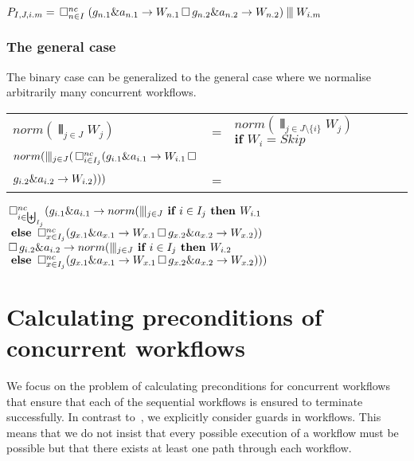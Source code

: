 \documentclass[11pt]{article}
\begin{document}
\noindent
$P_{I,J,i.m} = \, \Box^{nc}_{n \in I} \; (g_{n.1} \& a_{n.1} \rightarrow W_{n.1} \, \Box \, g_{n.2} \& a_{n.2} \rightarrow W_{n.2}) \interleave W_{i.m}$


\subsubsection{The general case}

The binary case can be generalized to the general case where we normalise arbitrarily many concurrent workflows.

\begin{tabular}{l c l}
    $norm(\interleave_{j \in J} W_j)$ &=& $norm(\interleave_{j \in J\setminus\{i\}} W_j)$ \quad $\textbf{if } W_i = Skip$ \\
    $norm(\interleave_{j \in J} (\, \Box^{nc}_{i \in I_j} (g_{i.1} \& a_{i.1} \rightarrow W_{i.1} 
                                                \, \Box \,$ \\
\hspace*{90pt}                        $g_{i.2} \& a_{i.2} \rightarrow W_{i.2})))$ &=& \\
\end{tabular}

\noindent
$\, \Box^{nc}_{i \in \biguplus_{I_j}} (g_{i.1} \& a_{i.1} \rightarrow norm(\interleave_{j \in J} \textbf{ if } i \in I_j \textbf{ then } W_{i.1}$ \\ 
 \hspace*{190pt} $ \textbf{ else } \, \Box^{nc}_{x \in I_j} (g_{x.1} \& a_{x.1} \rightarrow W_{x.1} \, \Box \, g_{x.2} \& a_{x.2} \rightarrow W_{x.2}))$ \\ 
\hspace*{28pt}$\, \Box \, g_{i.2} \& a_{i.2} \rightarrow norm(\interleave_{j \in J} \textbf{ if } i \in I_j \textbf{ then } W_{i.2}$ \\ 
 \hspace*{190pt} $ \textbf{ else } \, \Box^{nc}_{x \in I_j} (g_{x.1} \& a_{x.1} \rightarrow W_{x.1} \, \Box \, g_{x.2} \& a_{x.2} \rightarrow W_{x.2})))$     


\section{Calculating preconditions of concurrent workflows}
\label{sec:shared_workflows}

We focus on the problem of calculating preconditions for concurrent workflows that ensure that each of the sequential workflows is ensured to terminate successfully. In contrast to~\cite{Wang2012}, we explicitly consider guards in workflows. This means that we do not insist that every possible execution of a workflow must be possible but that there exists at least one path through each workflow.
\end{document}
